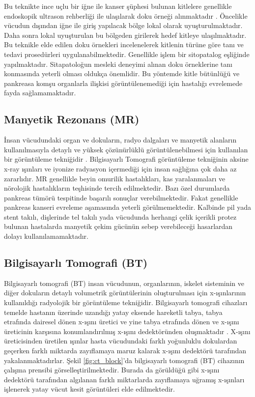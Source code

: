 Bu teknikte ince uçlu bir iğne ile kanser şüphesi bulunan kitlelere genellikle endoskopik ultrason rehberliği ile ulaşılarak doku örneği alınmaktadır \cite{robins1995fine,harewood2002endosonography,frossard2003performance}. Öncelikle vücudun dışından iğne ile giriş yapılacak bölge lokal olarak uyuşturulmaktadır. Daha sonra lokal uyuşturulan bu bölgeden girilerek hedef kitleye ulaşılmaktadır. Bu teknikle elde edilen doku örnekleri incelenelerek kitlenin türüne göre tanı ve tedavi prosedürleri uygulanabilmektedir. Genellikle işlem bir sitopatalog eşliğinde yapılmaktadır. Sitapatoloğun mesleki deneyimi alınan doku örneklerine tanı konmasında yeterli olması oldukça önemlidir. Bu yöntemde kitle bütünlüğü ve pankreasa komşu organlarla ilişkisi görüntülenemediği için hastalığı evrelemede fayda sağlamamaktadır. 

\subsection{Manyetik Rezonans (MR)}

İnsan vücudundaki organ ve dokuların, radyo dalgaları ve manyetik alanların kullanılmasıyla detaylı ve yüksek çözünürlüklü görüntülenebilmesi için kullanılan bir görüntüleme tekniğidir \cite{reimer2010clinical,semelka1993mr,tirkes2012mr}. Bilgisayarlı Tomografi görüntüleme tekniğinin aksine x-ray ışınları ve iyonize radyasyon içermediği için insan sağlığına çok daha az zararlıdır. MR genellikle beyin omurilik hastalıkları, kas yaralanmaları ve nörolojik hastalıkların teşhisinde tercih edilmektedir. Bazı özel durumlarda pankreas tümörü tespitinde başarılı sonuçlar verebilmektedir. Fakat genellikle pankreas kanseri evreleme aşamasında yeterli görülmemektedir. Kalbinde pil yada stent takılı, dişlerinde tel takılı yada vücudunda herhangi çelik içerikli protez bulunan hastalarda manyetik çekim gücünün sebep verebileceği hasarlardan dolayı kullanılamamaktadır.

\subsection{Bilgisayarlı Tomografi (BT)} 

Bilgisayarlı tomografi (BT) insan vücudunun, organlarının, iskelet sisteminin ve diğer dokuların detaylı volumetrik görüntülerinin oluşturulması için x-ışınlarının kullanıldığı radyolojik bir görüntüleme tekniğidir. Bilgisayarlı tomografi cihazları temelde hastanın üzerinde uzandığı yatay eksende hareketli tabya, tabya etrafında dairesel dönen x-ışını üretici ve yine tabya etrafında dönen ve x-ışını üreticinin karşısına konumlandırılmış x-ışını dedektöründen oluşmaktadır \cite{kalender2011computed,seeram2015computed}. X-ışını üreticisinden üretilen ışınlar hasta vücudundaki farklı yoğunluklu dokulardan geçerken farklı miktarda zayıflamaya maruz kalarak x-ışını dedektörü tarafından yakalanmaktadırlar. Şekil \ref{fig:ct_block}'da bilgisayarlı tomografi (BT) cihazının çalışma prensibi görselleştirilmektedir. Burada da görüldüğü gibi x-ışını dedektörü tarafından algılanan farklı miktarlarda zayıflamaya uğramış x-ışınları işlenerek yatay vücut kesit görüntüleri elde edilmektedir. 

